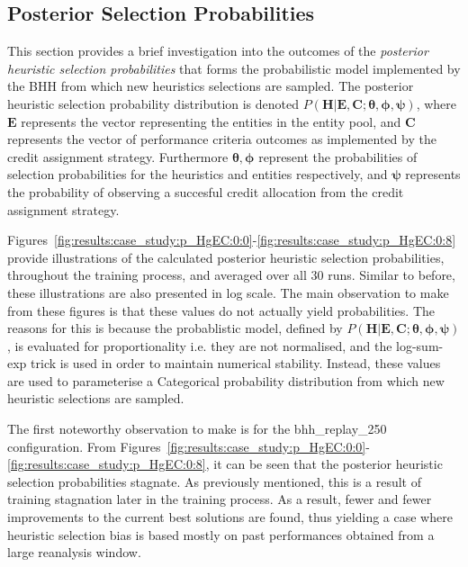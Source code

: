 \subsection{Posterior Selection Probabilities}\label{sec:results:case_study:posterior_selec_prob}

This section provides a brief investigation into the outcomes of the \textit{posterior heuristic selection probabilities} that forms the probabilistic model implemented by the \acs{BHH} from which new heuristics selections are sampled. The posterior heuristic selection probability distribution is denoted $P(\boldsymbol{H} \vert \boldsymbol{E}, \boldsymbol{C}; \boldsymbol{\theta}, \boldsymbol{\phi}, \boldsymbol{\psi})$, where $\boldsymbol{E}$ represents the vector representing the entities in the entity pool, and $\boldsymbol{C}$ represents the vector of performance criteria outcomes as implemented by the credit assignment strategy. Furthermore $\boldsymbol{\theta}, \boldsymbol{\phi}$ represent the probabilities of selection probabilities for the heuristics and entities respectively, and $\boldsymbol{\psi}$ represents the probability of observing a succesful credit allocation from the credit assignment strategy.

Figures~\ref{fig:results:case_study:p_HgEC:0:0}-\ref{fig:results:case_study:p_HgEC:0:8} provide illustrations of the calculated posterior heuristic selection probabilities, throughout the training process, and averaged over all 30 runs. Similar to before, these illustrations are also presented in log scale. The main observation to make from these figures is that these values do not actually yield probabilities. The reasons for this is because the probablistic model, defined by $P(\boldsymbol{H} \vert \boldsymbol{E}, \boldsymbol{C}; \boldsymbol{\theta}, \boldsymbol{\phi}, \boldsymbol{\psi})$, is evaluated for proportionality i.e. they are not normalised, and the log-sum-exp trick is used in order to maintain numerical stability. Instead, these values are used to parameterise a Categorical probability distribution from which new heuristic selections are sampled.

The first noteworthy observation to make is for the bhh\_replay\_250 configuration. From Figures~\ref{fig:results:case_study:p_HgEC:0:0}-\ref{fig:results:case_study:p_HgEC:0:8}, it can be seen that the posterior heuristic selection probabilities stagnate. As previously mentioned, this is a result of training stagnation later in the training process. As a result, fewer and fewer improvements to the current best solutions are found, thus yielding a case where heuristic selection bias is based mostly on past performances obtained from a large reanalysis window.

